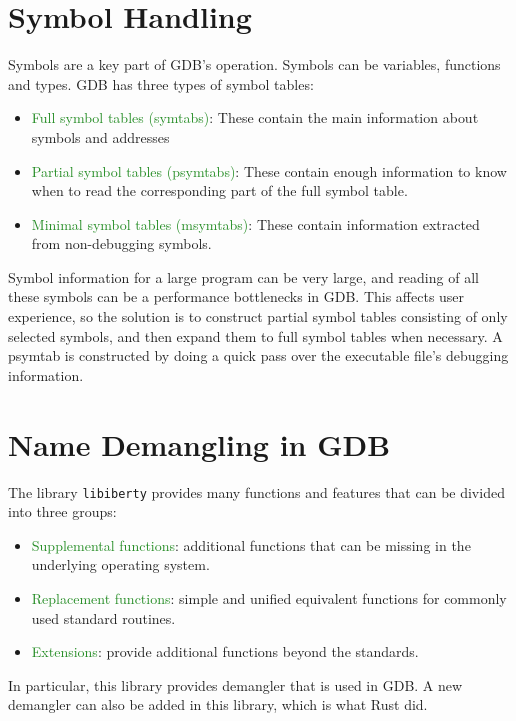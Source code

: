 \section{Symbol Handling}
Symbols are a key part of GDB's operation. Symbols can be variables, functions and
types. GDB has three types of symbol tables:
\begin{itemize}
    \item \textcolor{ForestGreen}{Full symbol tables (symtabs)}: These contain the main information
        about symbols and addresses
    \item \textcolor{ForestGreen} {Partial symbol tables (psymtabs)}: These contain enough information to
        know when to read the corresponding part of the full symbol table.
    \item \textcolor{ForestGreen}{Minimal symbol tables (msymtabs)}: These
        contain information extracted from non-debugging symbols.
\end{itemize}

Symbol information for a large program can be very large, and reading of all
these symbols can be a performance bottlenecks in GDB. This affects user
experience, so the solution is to construct partial symbol tables consisting of
only selected symbols, and then expand them to full symbol tables when
necessary.
A psymtab is constructed by doing a quick pass over the executable file's
debugging information.

\section{Name Demangling in GDB}
The library \verb|libiberty| provides many functions and features that can be
divided into three groups:
\begin{itemize}
    \item \textcolor{ForestGreen}{Supplemental functions}: additional functions that can be missing in
        the underlying operating system.
    \item \textcolor{ForestGreen}{Replacement functions}: simple and unified equivalent functions for
        commonly used standard routines.
    \item \textcolor{ForestGreen}{Extensions}: provide additional functions beyond the standards.
\end{itemize}

In particular, this library provides \CCS demangler that is used in GDB. A new
demangler can also be added in this library, which is what Rust did.
